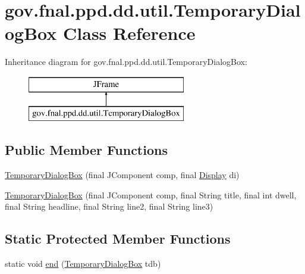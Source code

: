 \hypertarget{classgov_1_1fnal_1_1ppd_1_1dd_1_1util_1_1TemporaryDialogBox}{\section{gov.\-fnal.\-ppd.\-dd.\-util.\-Temporary\-Dialog\-Box Class Reference}
\label{classgov_1_1fnal_1_1ppd_1_1dd_1_1util_1_1TemporaryDialogBox}
}
Inheritance diagram for gov.\-fnal.\-ppd.\-dd.\-util.\-Temporary\-Dialog\-Box\-:\begin{figure}[H]
\begin{center}
\leavevmode
\includegraphics[height=2.000000cm]{classgov_1_1fnal_1_1ppd_1_1dd_1_1util_1_1TemporaryDialogBox}
\end{center}
\end{figure}
\subsection*{Public Member Functions}
\begin{DoxyCompactItemize}
\item 
\hyperlink{classgov_1_1fnal_1_1ppd_1_1dd_1_1util_1_1TemporaryDialogBox_ad9ce6f1fbd540890d49c154c9b032cc0}{Temporary\-Dialog\-Box} (final J\-Component comp, final \hyperlink{interfacegov_1_1fnal_1_1ppd_1_1dd_1_1signage_1_1Display}{Display} di)
\item 
\hyperlink{classgov_1_1fnal_1_1ppd_1_1dd_1_1util_1_1TemporaryDialogBox_a2ad3986b0c7dece6ae6550223bb592e7}{Temporary\-Dialog\-Box} (final J\-Component comp, final String title, final int dwell, final String headline, final String line2, final String line3)
\end{DoxyCompactItemize}
\subsection*{Static Protected Member Functions}
\begin{DoxyCompactItemize}
\item 
static void \hyperlink{classgov_1_1fnal_1_1ppd_1_1dd_1_1util_1_1TemporaryDialogBox_a47b5409d700e654115ab081005bdd533}{end} (\hyperlink{classgov_1_1fnal_1_1ppd_1_1dd_1_1util_1_1TemporaryDialogBox}{Temporary\-Dialog\-Box} tdb)
\end{DoxyCompactItemize}


